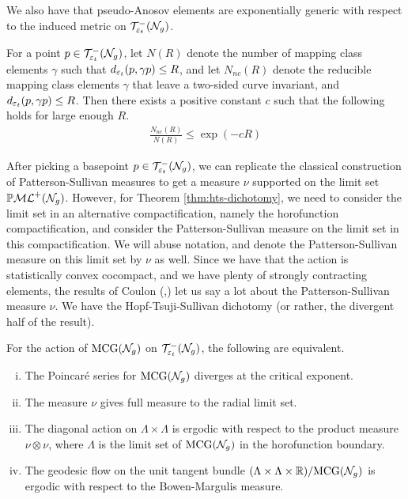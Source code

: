 We also have that pseudo-Anosov elements are exponentially generic with respect to the induced metric on $\mathcal{T}_{\varepsilon_t}^{-}(\mathcal{N}_g)$.

\begin{theorem}
  \label{thm:pure-exponential}
  For a point $p \in \mathcal{T}_{\varepsilon_t}^{-}(\mathcal{N}_g)$, let $N(R)$ denote the number of mapping class elements $\gamma$ such that $d_{\varepsilon_t}(p, \gamma p) \leq R$, and let $N_{nc}(R)$ denote the reducible mapping class elements $\gamma$ that leave a two-sided curve invariant, and $d_{\varepsilon_t}(p, \gamma p) \leq R$.
  Then there exists a positive constant $c$ such that the following holds for large enough $R$.
  \begin{align*}
    \frac{N_{nc}(R)}{N(R)} \leq \exp(-cR)
  \end{align*}
\end{theorem}

After picking a basepoint $p \in \mathcal{T}_{\varepsilon_t}^{-}(\mathcal{N}_g)$, we can replicate the classical construction of Patterson-Sullivan measures \cite{sullivan1979density} to get a measure $\nu$ supported on the limit set $\mathbb{P}\mathcal{ML}^+(\mathcal{N}_g)$.
However, for Theorem \ref{thm:hts-dichotomy}, we need to consider the limit set in an alternative compactification, namely the horofunction compactification, and consider the Patterson-Sullivan measure on the limit set in this compactification.
We will abuse notation, and denote the Patterson-Sullivan measure on this limit set by $\nu$ as well.
Since we have that the action is statistically convex cocompact, and we have plenty of strongly contracting elements, the results of Coulon (\cite{coulon2022patterson},\cite{coulon2024ergodicity}) let us say a lot about the Patterson-Sullivan measure $\nu$.
We have the Hopf-Tsuji-Sullivan dichotomy (or rather, the divergent half of the result).

\begin{theorem}
  \label{thm:hts-dichotomy}
  For the action of $\mathrm{MCG}(\mathcal{N}_g)$ on $\mathcal{T}_{\varepsilon_t}^{-}(\mathcal{N}_g)$, the following are equivalent.
  \begin{enumerate}[(i)]
  \item The Poincaré series for $\mathrm{MCG}(\mathcal{N}_g)$ diverges at the critical exponent.
  \item The measure $\nu$ gives full measure to the radial limit set.
  \item The diagonal action on $\Lambda \times \Lambda$ is ergodic with respect to the product measure $\nu \otimes \nu$, where $\Lambda$ is the limit set of $\mathrm{MCG}(\mathcal{N}_g)$ in the horofunction boundary.
  \item The geodesic flow on the unit tangent bundle $(\Lambda \times \Lambda \times \mathbb{R})/\mathrm{MCG}(\mathcal{N}_g)$ is ergodic with respect to the Bowen-Margulis measure.
  \end{enumerate}
\end{theorem}

